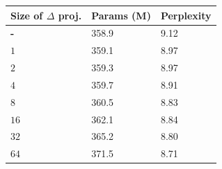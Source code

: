 \begin{tabular}{lll}
\hline
\textbf{Size of $\Delta$ proj.} & \textbf{Params (M)} & \textbf{Perplexity} \\
\hline
\textbf{-} & 358.9 & 9.12 \\
\textbf{$1$} & 359.1 & 8.97 \\
\textbf{$2$} & 359.3 & 8.97 \\
\textbf{$4$} & 359.7 & 8.91 \\
\textbf{$8$} & 360.5 & 8.83 \\
\textbf{$16$} & 362.1 & 8.84 \\
\textbf{$32$} & 365.2 & 8.80 \\
\textbf{$64$} & 371.5 & 8.71 \\
\hline
\end{tabular}
